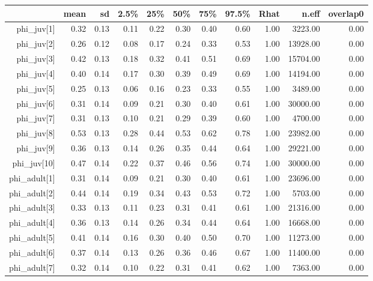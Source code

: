 \begin{table}[ht]
\centering
\begin{tabular}{rrrrrrrrrrr}
  \hline
 & mean & sd & 2.5\% & 25\% & 50\% & 75\% & 97.5\% & Rhat & n.eff & overlap0 \\ 
  \hline
phi\_juv[1] & 0.32 & 0.13 & 0.11 & 0.22 & 0.30 & 0.40 & 0.60 & 1.00 & 3223.00 & 0.00 \\ 
  phi\_juv[2] & 0.26 & 0.12 & 0.08 & 0.17 & 0.24 & 0.33 & 0.53 & 1.00 & 13928.00 & 0.00 \\ 
  phi\_juv[3] & 0.42 & 0.13 & 0.18 & 0.32 & 0.41 & 0.51 & 0.69 & 1.00 & 15704.00 & 0.00 \\ 
  phi\_juv[4] & 0.40 & 0.14 & 0.17 & 0.30 & 0.39 & 0.49 & 0.69 & 1.00 & 14194.00 & 0.00 \\ 
  phi\_juv[5] & 0.25 & 0.13 & 0.06 & 0.16 & 0.23 & 0.33 & 0.55 & 1.00 & 3489.00 & 0.00 \\ 
  phi\_juv[6] & 0.31 & 0.14 & 0.09 & 0.21 & 0.30 & 0.40 & 0.61 & 1.00 & 30000.00 & 0.00 \\ 
  phi\_juv[7] & 0.31 & 0.13 & 0.10 & 0.21 & 0.29 & 0.39 & 0.60 & 1.00 & 4700.00 & 0.00 \\ 
  phi\_juv[8] & 0.53 & 0.13 & 0.28 & 0.44 & 0.53 & 0.62 & 0.78 & 1.00 & 23982.00 & 0.00 \\ 
  phi\_juv[9] & 0.36 & 0.13 & 0.14 & 0.26 & 0.35 & 0.44 & 0.64 & 1.00 & 29221.00 & 0.00 \\ 
  phi\_juv[10] & 0.47 & 0.14 & 0.22 & 0.37 & 0.46 & 0.56 & 0.74 & 1.00 & 30000.00 & 0.00 \\ 
  phi\_adult[1] & 0.31 & 0.14 & 0.09 & 0.21 & 0.30 & 0.40 & 0.61 & 1.00 & 23696.00 & 0.00 \\ 
  phi\_adult[2] & 0.44 & 0.14 & 0.19 & 0.34 & 0.43 & 0.53 & 0.72 & 1.00 & 5703.00 & 0.00 \\ 
  phi\_adult[3] & 0.33 & 0.13 & 0.11 & 0.23 & 0.31 & 0.41 & 0.61 & 1.00 & 21316.00 & 0.00 \\ 
  phi\_adult[4] & 0.36 & 0.13 & 0.14 & 0.26 & 0.34 & 0.44 & 0.64 & 1.00 & 16668.00 & 0.00 \\ 
  phi\_adult[5] & 0.41 & 0.14 & 0.16 & 0.30 & 0.40 & 0.50 & 0.70 & 1.00 & 11273.00 & 0.00 \\ 
  phi\_adult[6] & 0.37 & 0.14 & 0.13 & 0.26 & 0.36 & 0.46 & 0.67 & 1.00 & 11400.00 & 0.00 \\ 
  phi\_adult[7] & 0.32 & 0.14 & 0.10 & 0.22 & 0.31 & 0.41 & 0.62 & 1.00 & 7363.00 & 0.00 \\ 

\end{tabular}
\end{table}
